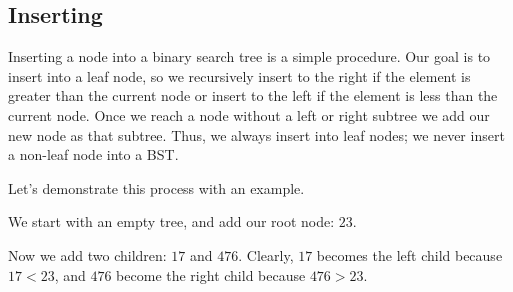 \begin{comment}
\begin{lstlisting}
def search(data, node):
    if node is None or node.value == data:
        return node
    elif data < node.value:
        search(data, node.left)
    else:
        search(data, node.right)
\end{lstlisting}
\end{comment}
\subsection*{Inserting}
Inserting a node into a binary search tree is a simple procedure.
Our goal is to insert into a leaf node, so we recursively insert to the right if the element is greater than the current node or insert to the left if the element is less than the current node.
Once we reach a node without a left or right subtree we add our new node as that subtree.
Thus, we always insert into leaf nodes; we never insert a non-leaf node into a BST.


Let's demonstrate this process with an example.

\begin{minipage}{0.4\textwidth}
\end{minipage}\hfill
\begin{minipage}{0.6\textwidth}
    We start with an empty tree, and add our root node: $23$.
\end{minipage}

\begin{minipage}{0.4\textwidth}
\end{minipage}\hfill
\begin{minipage}{0.6\textwidth}
    Now we add two children: $17$ and $476$.
    Clearly, $17$ becomes the left child because $17 < 23$, and $476$ become the right child because $476 > 23$.
\end{minipage}

